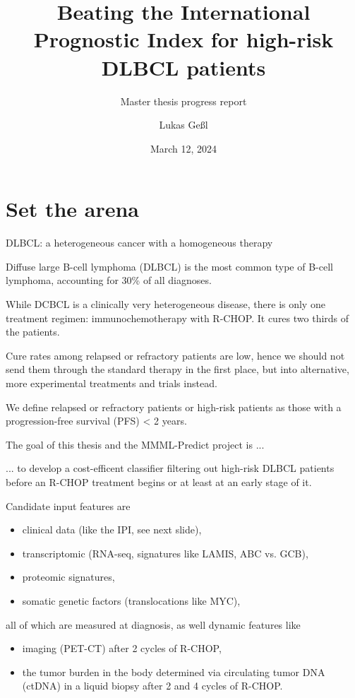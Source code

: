 \documentclass[10pt, aspectratio=169]{beamer}
\title{Beating the International Prognostic Index for high-risk DLBCL patients}
\subtitle{Master thesis progress report}
\date{March 12, 2024}
\author{Lukas Geßl}
\institute{Chair of Statistical Bioinformatics, Regensburg University}
\begin{document}
\maketitle

\section{Set the arena}

\begin{frame}{DLBCL: a heterogeneous cancer with a homogeneous therapy}

  Diffuse large B-cell lymphoma (DLBCL) is the most common type of B-cell lymphoma, 
  accounting for 30\% of all diagnoses.

  While DCBCL is a clinically very heterogeneous disease, there is only one treatment 
  regimen: immunochemotherapy with R-CHOP. It cures two thirds of the patients.

  Cure rates among relapsed or refractory patients are low, hence we should not send 
  them through the standard therapy in the first place, but into alternative, more 
  experimental treatments and trials instead. 
  
  We define relapsed or refractory patients or \alert{high-risk} patients as those with a 
  \alert{progression-free survival (PFS) < 2 years}.

\end{frame}

\begin{frame}{The goal of this thesis and the MMML-Predict project is ...}

  ... to develop a \alert{cost-efficent classifier filtering out high-risk DLBCL patients} before an R-CHOP 
  treatment begins or at least at an early stage of it. 

  Candidate input features are 

  \begin{itemize}
    \item clinical data (like the IPI, see next slide),
    \item transcriptomic (RNA-seq, signatures like LAMIS, ABC vs. GCB),
    \item proteomic signatures,
    \item somatic genetic factors (translocations like MYC),
  \end{itemize}

  all of which are measured \alert{at diagnosis}, as well \alert{dynamic} features like 

  \begin{itemize}
    \item imaging (PET-CT) after 2 cycles of R-CHOP,
    \item the tumor burden in the body determined via circulating tumor DNA (ctDNA) in a 
    liquid biopsy after 2 and 4 cycles of R-CHOP. 
  \end{itemize}

\end{frame}
\end{document}
